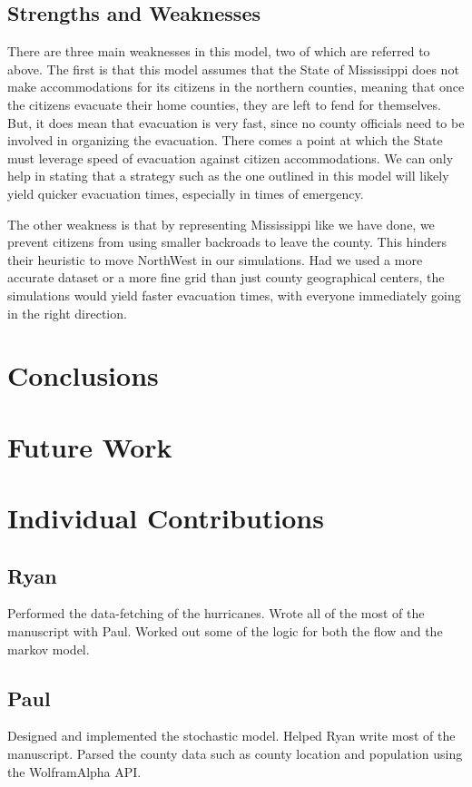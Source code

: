 \documentclass[titlepage]{article}
\begin{document}
  \subsection{Strengths and Weaknesses}
    \par There are three main weaknesses in this model, two of which are referred to above. The first is that this model assumes that the State of Mississippi does not make accommodations for its citizens in the northern counties, meaning that once the citizens evacuate their home counties, they are left to fend for themselves. But, it does mean that evacuation is very fast, since no county officials need to be involved in organizing the evacuation. There comes a point at which the State must leverage speed of evacuation against citizen accommodations. We can only help in stating that a strategy such as the one outlined in this model will likely yield quicker evacuation times, especially in times of emergency.
    \par The other weakness is that by representing Mississippi like we have done, we prevent citizens from using smaller backroads to leave the county. This hinders their heuristic to move NorthWest in our simulations. Had we used a more accurate dataset or a more fine grid than just county geographical centers, the simulations would yield faster evacuation times, with everyone immediately going in the right direction.

\section{Conclusions}
\label{sec:conclusions}


\section{Future Work}
\label{sec:future}

\section{Individual Contributions}
\label{sec:contributions}
\subsection*{Ryan}
Performed the data-fetching of the hurricanes. Wrote all of the most of the manuscript with Paul. Worked out some of the logic for both the flow and the markov model.

\subsection*{Paul}
Designed and implemented the stochastic model. Helped Ryan write most of the manuscript. Parsed the county data such as county location and population using the WolframAlpha API. 
\end{document}
